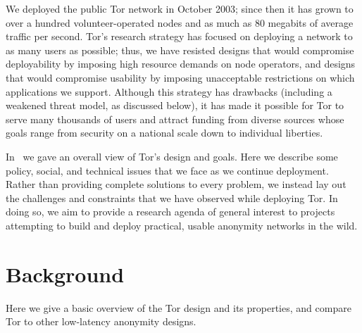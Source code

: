 \documentclass{llncs}
\begin{document}
We deployed the public Tor network in October 2003; since then it has
grown to over a hundred volunteer-operated nodes
and as much as 80 megabits of
average traffic per second.  Tor's research strategy has focused on deploying
a network to as many users as possible; thus, we have resisted designs that
would compromise deployability by imposing high resource demands on node
operators, and designs that would compromise usability by imposing
unacceptable restrictions on which applications we support.  Although this
strategy has
drawbacks (including a weakened threat model, as discussed below), it has
made it possible for Tor to serve many thousands of users and attract
funding from diverse sources whose goals range from security on a
national scale down to individual liberties.

In~\cite{tor-design} we gave an overall view of Tor's
design and goals.  Here we describe some policy, social, and technical
issues that we face as we continue deployment.
Rather than providing complete solutions to every problem, we
instead lay out the challenges and constraints that we have observed while
deploying Tor.  In doing so, we aim to provide a research agenda
of general interest to projects attempting to build
and deploy practical, usable anonymity networks in the wild.


\section{Background}
Here we give a basic overview of the Tor design and its properties, and
compare Tor to other low-latency anonymity designs.
\end{document}
